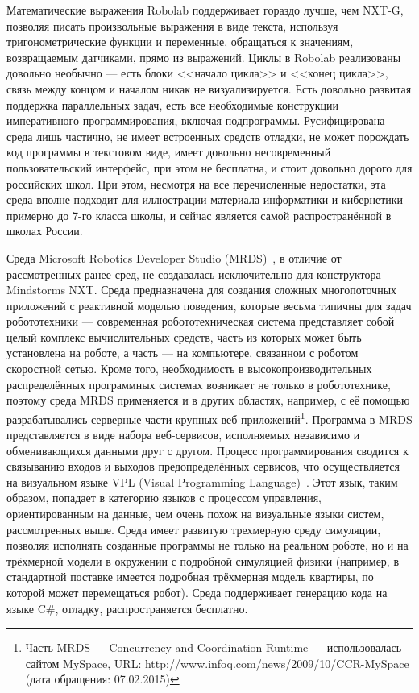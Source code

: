 Математические выражения Robolab поддерживает гораздо лучше, чем NXT-G, позволяя писать 
произвольные выражения в виде текста, используя тригонометрические функции и переменные, 
обращаться к значениям, возвращаемым датчиками, прямо из выражений. Циклы в Robolab 
реализованы довольно необычно --- есть блоки <<начало цикла>> и <<конец цикла>>, связь 
между концом и началом никак не визуализируется. Есть довольно развитая поддержка 
параллельных задач, есть все необходимые конструкции императивного программирования, 
включая подпрограммы. Русифицирована среда лишь частично, не имеет встроенных средств 
отладки, не может порождать код программы в текстовом виде, имеет довольно несовременный 
пользовательский интерфейс, при этом не бесплатна, и стоит довольно дорого для российских 
школ. При этом, несмотря на все перечисленные недостатки, эта среда вполне подходит 
для иллюстрации материала информатики и кибернетики примерно до 7-го класса школы,
и сейчас является самой распространённой в школах России.

Среда Microsoft Robotics Developer Studio 
(MRDS)~\cite{mrds}, в отличие от рассмотренных ранее сред, не создавалась исключительно для конструктора 
Mindstorms NXT. Среда предназначена для создания сложных многопоточных приложений с 
реактивной моделью поведения, которые весьма типичны для задач робототехники --- современная 
робототехническая система представляет собой целый комплекс вычислительных средств, 
часть из которых может быть установлена на роботе, а часть --- на компьютере, связанном 
с роботом скоростной сетью. Кроме того, необходимость в высокопроизводительных распределённых 
программных системах возникает не только в робототехнике, поэтому среда MRDS применяется 
и в других областях, например, с её помощью разрабатывались серверные части крупных 
веб-приложений\footnote{Часть MRDS --- Concurrency and Coordination Runtime --- использовалась сайтом MySpace,
URL: http://www.infoq.com/news/2009/10/CCR-MySpace (дата обращения: 07.02.2015)}. 
Программа в MRDS представляется в виде набора веб-сервисов, исполняемых независимо 
и обменивающихся данными друг с другом. Процесс программирования сводится к связыванию 
входов и выходов предопределённых сервисов, что осуществляется на визуальном языке 
VPL (Visual Programming Language)~\cite{vpl}. Этот язык, таким образом, попадает в категорию 
языков с процессом управления, ориентированным на данные, чем очень похож на визуальные 
языки систем, рассмотренных выше. Среда имеет развитую трехмерную среду симуляции, позволяя 
исполнять созданные программы не только на реальном роботе, но и на трёхмерной модели в 
окружении с подробной симуляцией физики (например, в стандартной поставке имеется подробная 
трёхмерная модель квартиры, по которой может перемещаться робот). Среда поддерживает 
генерацию кода на языке C\#, отладку, распространяется бесплатно.

